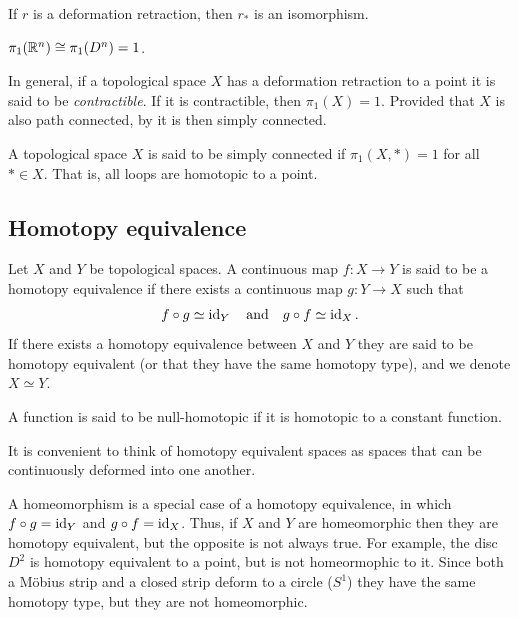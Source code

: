 \documentclass[11pt,a4paper]{article}
\begin{document}
\begin{proposition}
  If $r$ is a deformation retraction, then $r_*$ is an isomorphism.
\end{proposition}

\begin{corollary}
  $\pi_1(\mathbb{R}^n) \cong \pi_1(D^n) = 1$.
\end{corollary}

\begin{remark}
  In general, if a topological space $X$ has a deformation retraction
  to a point it is said to be \textit{contractible}.
  If it is contractible, then $\pi_1(X) = 1$.
  Provided that $X$ is also path connected, 
  by 
  it is then simply connected.
\end{remark}

\begin{definition}
  A topological space $X$ is said to be simply connected if
  $\pi_1(X,*) = 1$ for all $* \in X$.
  That is, all loops are homotopic to a point.
\end{definition}

\subsection{Homotopy equivalence}
\begin{definition}
  Let $X$ and $Y$ be topological spaces.
  A continuous map $f \colon X \to Y$ is said to be a homotopy equivalence if
  there exists a continuous map $g \colon Y \to X$ such that
  \[
    f \circ g \simeq \operatorname{id}_Y \quad \text{and} \quad
    g \circ f \simeq \operatorname{id}_X.
  \]
  If there exists a homotopy equivalence between $X$ and $Y$
  they are said to be homotopy equivalent (or that they have the same
  homotopy type), and we denote $X \simeq Y$.
\end{definition}

\begin{definition}
  A function is said to be null-homotopic if it is homotopic to a constant
  function.
\end{definition}

\begin{remark}
  It is convenient to think of homotopy equivalent spaces as spaces
  that can be continuously deformed into one another.
\end{remark}

\begin{remark}
  A homeomorphism is a special case of a homotopy equivalence,
  in which $f \circ g = \operatorname{id}_Y$ and $g \circ f = \operatorname{id}_X$.
  Thus, if $X$ and $Y$ are homeomorphic then they are homotopy
  equivalent, but the opposite is not always true.
  For example, the disc $D^2$ is homotopy equivalent to a point,
  but is not homeormophic to it.
  Since both a M\"obius strip and a closed strip deform to a circle ($S^1$)
  they have the same homotopy type, but they are not homeomorphic.
\end{remark}
\end{document}
